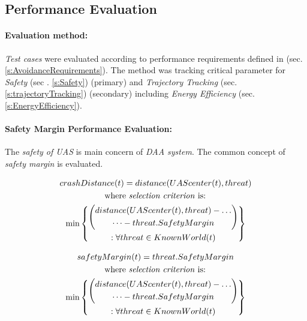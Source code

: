 \subsection{Performance Evaluation}\label{s:performanceEvaluation}
\paragraph{Evaluation method:} \emph{Test cases} were evaluated according to performance requirements defined in (sec. \ref{s:AvoidanceRequirements}). The method was tracking critical parameter for \emph{Safety} (sec . \ref{s:Safety}) (primary) and \emph{Trajectory Tracking} (sec. \ref{s:trajectoryTracking}) (secondary) including \emph{Energy Efficiency} (sec. \ref{s:EnergyEfficiency}).

\paragraph{Safety Margin Performance Evaluation:} The \emph{safety of UAS} is main concern of \emph{DAA system}. The common concept of \emph{safety margin} is evaluated. 

\begin{multline}
    crashDistance(t) =  distance(UAScenter(t),threat) \\\text{  where \emph{selection criterion} is:  }\\ \min \left\{\begin{gathered}\left( \begin{gathered} distance(UAScenter(t),threat)-\dots\\\dots-threat.SafetyMargin\end{gathered}\right)\\:\forall threat \in KnownWorld (t)\end{gathered}\right\}
\end{multline}


\begin{multline}
    safety Margin(t) =  threat.SafetyMargin\\\text{  where \emph{selection criterion} is:  }\\ \min \left\{\begin{gathered}\left( \begin{gathered} distance(UAScenter(t),threat)-\dots\\\dots-threat.SafetyMargin\end{gathered}\right)\\:\forall threat \in KnownWorld (t)\end{gathered}\right\}
\end{multline}


